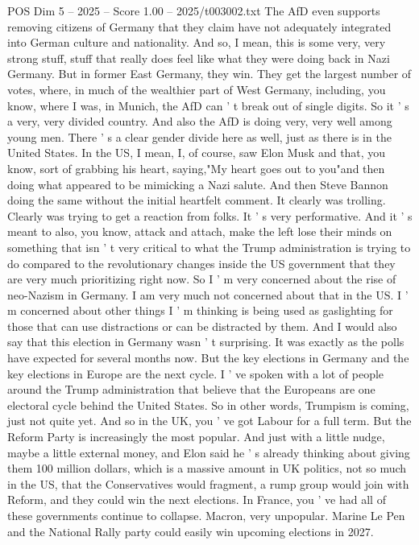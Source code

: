 \begin{textsample}{POS Dim 5 – 2025 – Score 1.00 – 2025/t003002.txt}
The AfD even supports removing citizens of Germany that they claim have not adequately integrated into German culture and nationality.
And so, I mean, this is some very, very strong stuff, stuff that really does feel like what they were doing back in Nazi Germany.
But in former East Germany, they win.
They get the largest number of votes, where, in much of the wealthier part of West Germany, including, you know, where I was, in Munich, the AfD can ' t break out of single digits.
So it ' s a very, very divided country.
And also the AfD is doing very, very well among young men.
There ' s a clear gender divide here as well, just as there is in the United States.
In the US, I mean, I, of course, saw Elon Musk and that, you know, sort of grabbing his heart, saying,"My heart goes out to you"and then doing what appeared to be mimicking a Nazi salute.
And then Steve Bannon doing the same without the initial heartfelt comment.
It clearly was trolling.
Clearly was trying to get a reaction from folks.
It ' s very performative.
And it ' s meant to also, you know, attack and attach, make the left lose their minds on something that isn ' t very critical to what the Trump administration is trying to do compared to the revolutionary changes inside the US government that they are very much prioritizing right now.
So I ' m very concerned about the rise of neo-Nazism in Germany.
I am very much not concerned about that in the US.
I ' m concerned about other things I ' m thinking is being used as gaslighting for those that can use distractions or can be distracted by them.
And I would also say that this election in Germany wasn ' t surprising.
It was exactly as the polls have expected for several months now.
But the key elections in Germany and the key elections in Europe are the next cycle.
I ' ve spoken with a lot of people around the Trump administration that believe that the Europeans are one electoral cycle behind the United States.
So in other words, Trumpism is coming, just not quite yet.
And so in the UK, you ' ve got Labour for a full term.
But the Reform Party is increasingly the most popular.
And just with a little nudge, maybe a little external money, and Elon said he ' s already thinking about giving them 100 million dollars, which is a massive amount in UK politics, not so much in the US, that the Conservatives would fragment, a rump group would join with Reform, and they could win the next elections.
In France, you ' ve had all of these governments continue to collapse.
Macron, very unpopular.
Marine Le Pen and the National Rally party could easily win upcoming elections in 2027.

\end{textsample}
